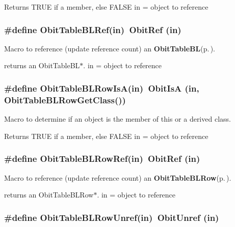 Returns TRUE if a member, else FALSE in = object to reference 
\subsubsection{\setlength{\rightskip}{0pt plus 5cm}\#define Obit\-Table\-BLRef(in)\ Obit\-Ref (in)}\label{ObitTableBL_8h_a2}


Macro to reference (update reference count) an {\bf Obit\-Table\-BL}{\rm (p.\,\pageref{structObitTableBL})}. 

returns an Obit\-Table\-BL$\ast$. in = object to reference 
\subsubsection{\setlength{\rightskip}{0pt plus 5cm}\#define Obit\-Table\-BLRow\-Is\-A(in)\ Obit\-Is\-A (in, Obit\-Table\-BLRow\-Get\-Class())}\label{ObitTableBL_8h_a6}


Macro to determine if an object is the member of this or a derived class. 

Returns TRUE if a member, else FALSE in = object to reference 
\subsubsection{\setlength{\rightskip}{0pt plus 5cm}\#define Obit\-Table\-BLRow\-Ref(in)\ Obit\-Ref (in)}\label{ObitTableBL_8h_a5}


Macro to reference (update reference count) an {\bf Obit\-Table\-BLRow}{\rm (p.\,\pageref{structObitTableBLRow})}. 

returns an Obit\-Table\-BLRow$\ast$. in = object to reference 
\subsubsection{\setlength{\rightskip}{0pt plus 5cm}\#define Obit\-Table\-BLRow\-Unref(in)\ Obit\-Unref (in)}\label{ObitTableBL_8h_a4}


